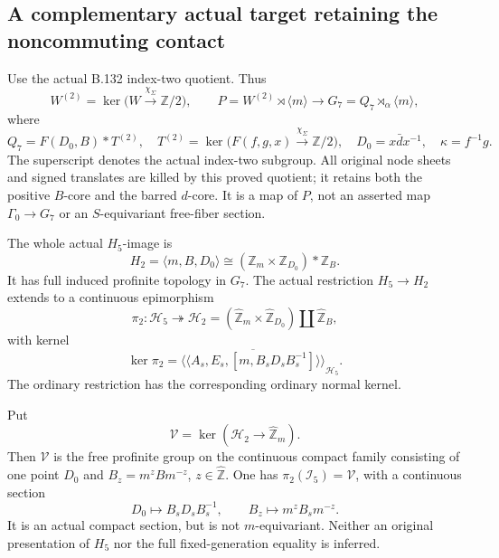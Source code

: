 \subsection*{A complementary actual target retaining the noncommuting contact}
\label{stmt:B173}
Use the actual B.132 index-two quotient. Thus
\[
 W^{(2)}=\ker\bigl(W\xrightarrow{\chi_\Sigma}\mathbb Z/2\bigr),\qquad
 P=W^{(2)}\rtimes\langle m\rangle
       \longrightarrow G_7=Q_7\rtimes_\alpha\langle m\rangle,
\]
where
\[
 Q_7=F(D_0,B)*T^{(2)},\quad
 T^{(2)}=\ker\bigl(F(f,g,x)\xrightarrow{\chi_\Sigma}\mathbb Z/2\bigr),
 \quad D_0=x\bar d x^{-1},\quad\kappa=f^{-1}g.
\]
The superscript denotes the actual index-two subgroup. All original
node sheets and signed translates are killed by this proved quotient;
it retains both the positive \(B\)-core and the barred \(d\)-core.
It is a map of \(P\), not an asserted map
\(\Gamma_0\to G_7\) or an \(S\)-equivariant free-fiber section.

The whole actual \(H_5\)-image is
\begin{equation}\label{eq:B173-image}
 H_2=\langle m,B,D_0\rangle
       \cong(\mathbb Z_m\times\mathbb Z_{D_0})*\mathbb Z_B.
\end{equation}
It has full induced profinite topology in \(G_7\).
The actual restriction \(H_5\to H_2\) extends to a continuous epimorphism
\[
 \pi_2:\mathcal H_5\twoheadrightarrow
 \mathcal H_2=
   (\widehat{\mathbb Z}_m\times\widehat{\mathbb Z}_{D_0})
       \amalg\widehat{\mathbb Z}_B,
\]
with kernel
\begin{equation}\label{eq:B173-source-kernel}
 \ker\pi_2=
 \overline{\langle\!\langle
     A_s,E_s,[m,B_sD_sB_s^{-1}]
                  \rangle\!\rangle}_{\mathcal H_5}.
\end{equation}
The ordinary restriction has the corresponding ordinary normal kernel.

Put
\[
 \mathcal V=\ker(\mathcal H_2\to\widehat{\mathbb Z}_m).
\]
Then \(\mathcal V\) is the free profinite group on the continuous compact
family consisting of one point \(D_0\) and
\(B_z=m^zBm^{-z}\), \(z\in\widehat{\mathbb Z}\).
One has \(\pi_2(\mathcal I_5)=\mathcal V\), with a continuous section
\begin{equation}\label{eq:B173-section}
 D_0\longmapsto B_sD_sB_s^{-1},\qquad
 B_z\longmapsto m^zB_sm^{-z}.
\end{equation}
It is an actual compact section, but is not \(m\)-equivariant.
Neither an original presentation of \(H_5\) nor the full
fixed-generation equality is inferred.

